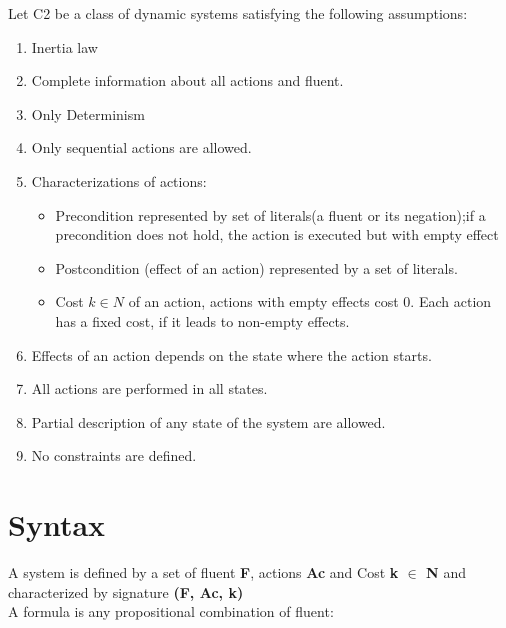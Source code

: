 \documentclass[11pt]{article}
\begin{document}
	Let C2 be a class of dynamic systems satisfying the following assumptions:
	\begin{enumerate}
		\item Inertia law
		\item Complete information about all actions and fluent. 
		\item Only Determinism
		\item Only sequential actions are allowed.
		\item Characterizations of actions:\begin{itemize}
			\item Precondition represented by set of literals(a fluent or its negation);if a precondition does not hold, the action is executed but with empty effect
			\item Postcondition (effect of an action) represented by a set of literals.
			\item Cost $k \in N $ of an action, actions with empty effects cost 0. Each action has a fixed cost, if it leads to non-empty effects. 
		\end{itemize}
		\item Effects of an action depends on the state where the action starts.
		\item All actions are performed in all states.
		\item Partial description of any state of the system are allowed.
		\item No constraints are defined.	 
	\end{enumerate}
	
	\section{Syntax}\label{sec:syntax}
	A system is defined by a set of fluent {\bfseries F}, actions {\bfseries Ac} and Cost {\bfseries k \(\in\) N} and characterized by signature {\bfseries(F, Ac, k)}\\
	A formula is any propositional combination of fluent:
	
\end{document}
